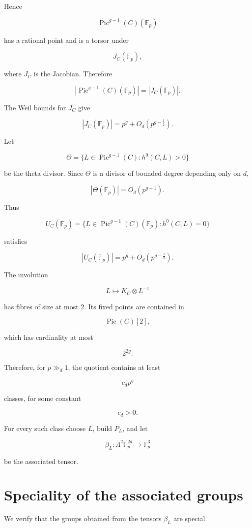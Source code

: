 \documentclass[11pt]{article}
\begin{document}
Hence

\[
\operatorname{Pic}^{g-1}(C)(\mathbb F_p)
\]

has a rational point and is a torsor under

\[
J_C(\mathbb F_p),
\]

where $J_C$ is the Jacobian. Therefore

\[
|\operatorname{Pic}^{g-1}(C)(\mathbb F_p)|
=|J_C(\mathbb F_p)|.
\]

The Weil bounds for $J_C$ give

\[
|J_C(\mathbb F_p)|
=p^g+O_d(p^{g-\frac12}).
\]

Let

\[
\Theta=
\{L\in\operatorname{Pic}^{g-1}(C):h^0(C,L)>0\}
\]

be the theta divisor. Since $\Theta$ is a divisor of bounded degree depending only on $d$,

\[
|\Theta(\mathbb F_p)|=O_d(p^{g-1}).
\]

Thus

\[
U_C(\mathbb F_p)
=\{L\in\operatorname{Pic}^{g-1}(C)(\mathbb F_p)
:
h^0(C,L)=0\}
\]

satisfies

\[
|U_C(\mathbb F_p)|
=p^g+O_d(p^{g-\frac12}).
\]

The involution

\[
L\mapsto K_C\otimes L^{-1}
\]

has fibres of size at most $2$. Its fixed points are contained in

\[
\operatorname{Pic}(C)[2],
\]

which has cardinality at most

\[
2^{2g}.
\]

Therefore, for $p\gg_d1$, the quotient contains at least

\[
c_d p^g
\]

classes, for some constant

\[
c_d>0.
\]

For every such class choose $L$, build $P_L$, and let

\[
\beta_L:\Lambda^2\mathbb F_p^{2d}\to\mathbb F_p^3
\]

be the associated tensor.

\section{Speciality of the associated groups}

We verify that the groups obtained from the tensors $\beta_L$ are special.
\end{document}
